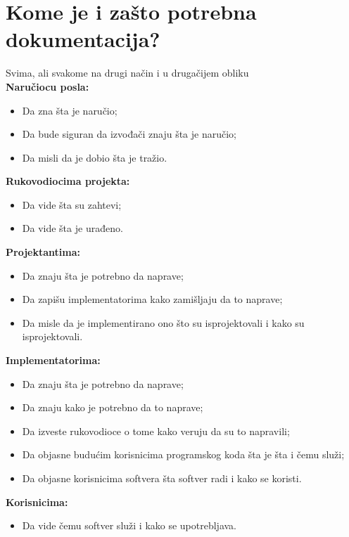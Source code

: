 \documentclass[a4paper]{article}
\begin{document}
\section{Kome je i zašto potrebna dokumentacija?}
  Svima, ali svakome na drugi način i u drugačijem obliku\\
  \textbf{Naručiocu posla:}
  \begin{itemize}
    \item Da zna šta je naručio;
    \item Da bude siguran da izvođači znaju šta je naručio;
    \item Da misli da je dobio šta je tražio.
  \end{itemize}
  \textbf{Rukovodiocima projekta:}
  \begin{itemize}
    \item Da vide šta su zahtevi;
    \item Da vide šta je urađeno.
  \end{itemize}
  \textbf{Projektantima:}
  \begin{itemize}
    \item Da znaju šta je potrebno da naprave;
    \item Da zapišu implementatorima kako zamišljaju da to naprave;
    \item Da misle da je implementirano ono što su isprojektovali i kako su isprojektovali.
  \end{itemize}
  \textbf{Implementatorima:}
  \begin{itemize}
    \item Da znaju šta je potrebno da naprave;
    \item Da znaju kako je potrebno da to naprave;
    \item Da izveste rukovodioce o tome kako veruju da su to napravili;
    \item Da objasne budućim korisnicima programskog koda šta je šta i čemu služi;
    \item Da objasne korisnicima softvera šta softver radi i kako se koristi.
  \end{itemize}
  \textbf{Korisnicima:} 
  \begin{itemize}
    \item Da vide čemu softver služi i kako se upotrebljava.
  \end{itemize}
  
\end{document}
